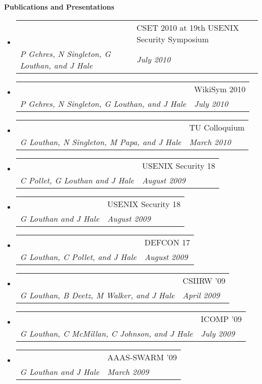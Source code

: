 \documentclass[letterpaper,11pt]{article}
\makeatletter
\newcommand{\resheading}[1]{{\large \colorbox{mygrey}{\begin{minipage}{\textwidth}{\textbf{#1 \vphantom{p\^{E}}}}\end{minipage}}}}
\newcommand{\ressubheading}[4]{
\begin{tabular*}{6.5in}[t]{l@{\extracolsep{\fill}}l}
		\textbf{\parbox[t]{4.5in}{\raggedright #1 }} & \parbox[b]{1.5in}{#2} \\
		\textit{#3} & \textit{#4} \\
\end{tabular*}\vspace{-6pt}}
\makeatother
\begin{document}
\resheading{Publications and Presentations}
\begin{itemize}
\item
	\ressubheading{\emph{The Blunderdome: An Offensive Exercise for Building Network, Systems, and Web Security Awareness}\footnotemark[1]}{CSET 2010 at 19th USENIX Security Symposium}{P Gehres, N Singleton, G Louthan, and J Hale}{July 2010}
\item
	\ressubheading{\emph{Toward Sensitive Information Redaction in a Collaborative, Multilevel Security Environment}\footnotemark[1]}{WikiSym 2010}{P Gehres, N Singleton, G Louthan, and J Hale}{July 2010}
\item
	\ressubheading{\emph{Towards Formal Analysis of Cyber-Physical Systems}}{TU Colloquium}{G Louthan, N Singleton, M Papa, and J Hale}{March 2010}
\item
	\ressubheading{\emph{Large-scale Multitouch Interactive Network Visualization} (Poster)}{USENIX Security 18}{C Pollet, G Louthan and J Hale}{August 2009}
\item
	\ressubheading{\emph{SAND: An Architecture for Signature-based Automatic Network Protocol Detection} (Poster)}{USENIX Security 18}{G Louthan and J Hale}{August 2009}
\item
	\ressubheading{\emph{Hack Like the Movie Stars: A Big-Screen Multitouch Network Monitor}}{DEFCON 17}{G Louthan, C Pollet, and J Hale}{August 2009}
\item
	\ressubheading{\emph{Content-based Alternatives to Conventional Network Monitoring}\footnotemark[1]}{CSIIRW '09}{G Louthan, B Deetz, M Walker, and J Hale}{April 2009}
\item
	\ressubheading{\emph{Toward Robust and Extensible Network Protocol Identification}\footnotemark[1]}{ICOMP '09}{G Louthan, C McMillan, C Johnson, and J Hale}{July 2009}
\item
	\ressubheading{\emph{Communication without Boundaries: Breaching the Great Firewall of China}}{AAAS-SWARM '09}{G Louthan and J Hale}{March 2009}
\end{itemize}

\end{document}
